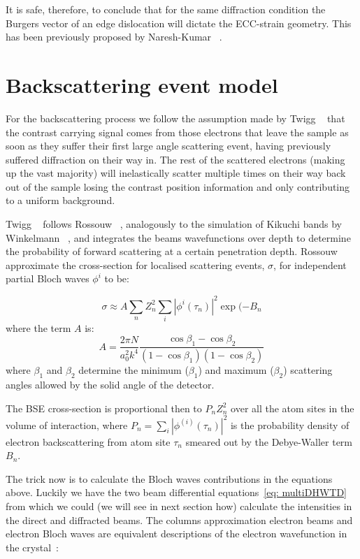 It is safe, therefore, to conclude that for the same diffraction condition the Burgers vector of an edge dislocation will dictate the ECC-strain geometry. This has been previously proposed by Naresh-Kumar \etal~\cite{Naresh}.



\pagebreak
\section{Backscattering event model}


For the backscattering process we follow the assumption made by Twigg \etal~\cite{Twigg09} that the contrast carrying signal comes from those electrons that leave the sample as soon as they suffer their first large angle scattering event, having previously suffered diffraction on their way in. The rest of the scattered electrons (making up the vast majority) will inelastically scatter multiple times on their way back out of the sample losing the contrast position information and only contributing to a uniform background. 

Twigg \etal~\cite{Twigg09} follows Rossouw \etal~\cite{Rossouw94}, analogously to the simulation of Kikuchi bands by Winkelmann \etal~\cite{Winkelmann07}, and integrates the beams wavefunctions over depth  to determine the probability of forward scattering at a certain penetration depth.  Rossouw \etal~\cite{Rossouw94}  approximate the cross-section for localised scattering events, $\sigma$, for independent partial Bloch waves $\phi^i$ to be:

\begin{equation}
    \sigma \approx A \sum_n Z_n^2 \sum_i | \phi^i(\tau_n)|^2 \exp{(-B_n}
\end{equation}
where the term $A$ is:
\begin{equation}
    A = \frac{2\pi N}{a_0^2 k^4} \frac{\cos{\beta_1} - \cos{\beta_2}}{(1-\cos{\beta_1})(1-\cos{\beta_2})}
\end{equation}
where $\beta_1$ and $\beta_2$ determine the minimum ($\beta_1$) and maximum ($\beta_2$) scattering angles allowed by the solid angle of the detector.

The BSE cross-section is proportional then to $P_n Z_n^2$ over all the atom sites in the volume of interaction, where $P_n=\sum_i |\phi^{(i)}(\tau_n)|^2$ is the probability density of electron backscattering from atom site $\tau_n$ smeared out by the Debye-Waller term $B_n$. 

The trick now is to calculate the Bloch waves contributions in the equations above. Luckily we have the two beam differential equations~\ref{eq: multiDHWTD} from which we could (we will see in next section how) calculate the intensities in the direct and diffracted beams. The columns approximation electron beams and electron Bloch waves are equivalent descriptions of the electron wavefunction in the crystal~\cite{Howie61}:

